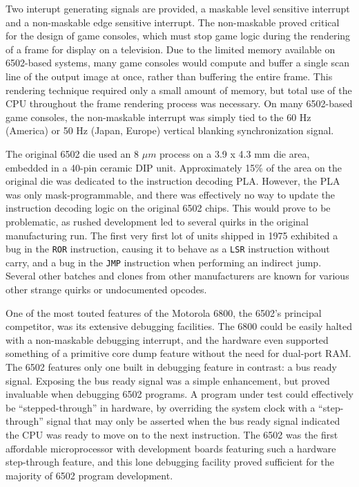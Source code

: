 \documentclass[journal]{IEEEtran}
\begin{document}
Two interupt generating signals are provided, a maskable level sensitive
interrupt and a non-maskable edge sensitive interrupt. The non-maskable proved
critical for the design of game consoles, which must stop game logic during the
rendering of a frame for display on a television. Due to the limited memory
available on 6502-based systems, many game consoles would compute and buffer a
single scan line of the output image at once, rather than buffering the entire
frame. This rendering technique required only a small amount of memory, but
total use of the CPU throughout the frame rendering process was necessary. On
many 6502-based game consoles, the non-maskable interrupt was simply tied to the
60 Hz (America) or 50 Hz (Japan, Europe) vertical blanking synchronization
signal.

The original 6502 die used an 8 $\mu m$ process on a 3.9 x 4.3 mm die area,
embedded in a 40-pin ceramic DIP unit. Approximately 15\% of the area on the
original die was dedicated to the instruction decoding PLA. However, the PLA was
only mask-programmable, and there was effectively no way to update the
instruction decoding logic on the original 6502 chips. This would prove to be
problematic, as rushed development led to several quirks in the original
manufacturing run. The first very first lot of units shipped in 1975 exhibited
a bug in the \texttt{ROR} instruction, causing it to behave as a \texttt{LSR}
instruction without carry, and a bug in the \texttt{JMP} instruction when
performing an indirect jump. Several other batches and clones from other
manufacturers are known for various other strange quirks or undocumented
opcodes.

One of the most touted features of the Motorola 6800, the 6502's principal
competitor, was its extensive debugging facilities. The 6800 could be easily
halted with a non-maskable debugging interrupt, and the hardware even supported
something of a primitive core dump feature without the need for dual-port RAM.
The 6502 features only one built in debugging feature in contrast: a bus ready
signal. Exposing the bus ready signal was a simple enhancement, but proved
invaluable when debugging 6502 programs. A program under test could effectively
be ``stepped-through'' in hardware, by overriding the system clock with a
``step-through'' signal that may only be asserted when the bus ready signal
indicated the CPU was ready to move on to the next instruction. The 6502 was the
first affordable microprocessor with development boards featuring such a
hardware step-through feature, and this lone debugging facility proved
sufficient for the majority of 6502 program development.
\end{document}
